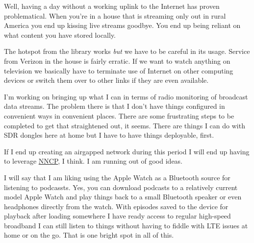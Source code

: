 Well, having a day without a working uplink to the Internet has proven
problematical. When you're in a house that is streaming only out in
rural America you end up kissing live streams goodbye. You end up being
reliant on what content you have stored locally.

The hotspot from the library works \emph{but} we have to be careful in
its usage. Service from Verizon in the house is fairly erratic. If we
want to watch anything on television we basically have to terminate use
of Internet on other computing devices or switch them over to other
links if they are even available.

I'm working on bringing up what I can in terms of radio monitoring of
broadcast data streams. The problem there is that I don't have things
configured in convenient ways in convenient places. There are some
frustrating steps to be completed to get that straightened out, it
seems. There are things I can do with SDR dongles here at home but I
have to have things deployable, first.

If I end up creating an airgapped network during this period I will end
up having to leverage \href{http://www.nncpgo.org/}{NNCP}, I think. I am
running out of good ideas.

I will say that I am liking using the Apple Watch as a Bluetooth source
for listening to podcassts. Yes, you can download podcasts to a
relatively current model Apple Watch and play things back to a small
Bluetooth speaker or even headphones directly from the watch. With
episodes saved to the device for playback after loading somewhere I have
ready access to regular high-speed broadband I can still listen to
things without having to fiddle with LTE issues at home or on the go.
That is one bright spot in all of this.
